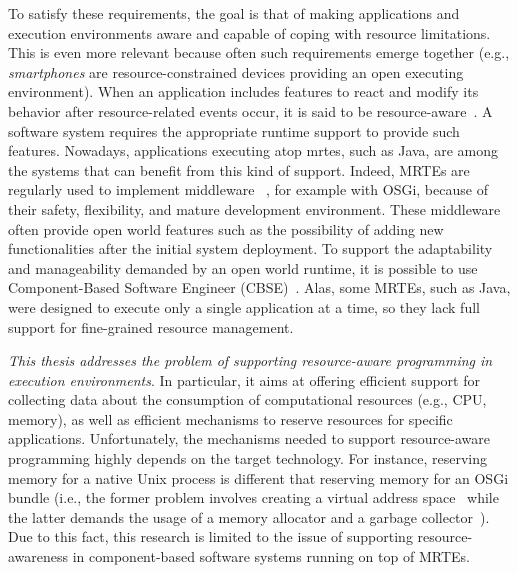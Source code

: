To satisfy these requirements, the goal is that of making applications and execution environments aware and capable of coping with resource limitations.
This is even more relevant because often such requirements emerge together
(e.g., \textit{smartphones} are resource-constrained devices providing an open executing environment).
When an application includes features to react and modify its behavior after resource-related events occur, it is said to be resource-aware~\cite{Boldrini:2008:CRA:1549824.1550106,Peddemors:2007:NRA:1256316.1256338,Alhaisoni:2010:RTO:1664767.1664770,Polo:2011:RAS:2414338.2414352,Bulej:2012:PAC:2408860.2410068,autili2012hybrid}.
A software system requires the appropriate runtime support to provide such features.
Nowadays, applications executing atop \glspl{mrte}, such as Java, are among the systems that can benefit from this kind of support.
Indeed, MRTEs are regularly used to implement middleware ~\cite{Bruneton:2006:FCM:1152333.1152345,Fouquet:2014:DED:2602576.2611461,OracleEJB3.0,Becker:2010:PCM:1712605.1712651,Carlson2006127}, for example with OSGi, because of their safety, flexibility, and mature development environment.
These middleware often provide open world features such as the possibility of adding new functionalities after the initial system deployment.
To support the adaptability and manageability demanded by an open world runtime, it is possible to use  Component-Based Software Engineer (CBSE)~\cite{gruntz2002component,Duclos:2002:DUN:508386.508394, Bruneton:2006:FCM:1152333.1152345}.
Alas, some MRTEs, such as Java, were designed to execute only a single application at a time, so they lack full support for fine-grained resource management.

  
\textit{This thesis addresses the problem of supporting resource-aware programming in execution environments}.
In particular, it aims at offering efficient support for collecting data about the consumption of computational resources (e.g., CPU, memory), as well as efficient mechanisms to reserve resources for specific applications.
Unfortunately, the mechanisms needed to support resource-aware programming highly depends on the target technology.
For instance, reserving memory for a native Unix process is different that reserving memory for an OSGi bundle (i.e., the former problem involves creating a virtual address space~\cite{Stallings2014} while the latter demands the usage of a memory allocator and a garbage collector~\cite{OSGiAlliance2014,alpern2000jalapeno,Richard2012,Geoffray:2010:VSM:1837854.1736006}).
Due to this fact, this research is limited to the issue of supporting resource-awareness in component-based software systems running on top of MRTEs.


